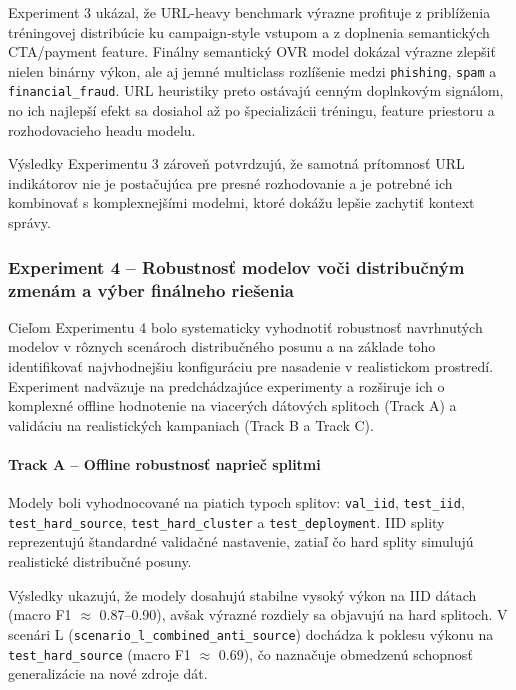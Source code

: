\documentclass[conference]{IEEEtran}
\begin{document}
Experiment 3 ukázal, že URL-heavy benchmark výrazne profituje z priblíženia tréningovej distribúcie ku campaign-style vstupom a z doplnenia semantických CTA/payment feature. Finálny semantický OVR model dokázal výrazne zlepšiť nielen binárny výkon, ale aj jemné multiclass rozlíšenie medzi \texttt{phishing}, \texttt{spam} a \texttt{financial\_fraud}. URL heuristiky preto ostávajú cenným doplnkovým signálom, no ich najlepší efekt sa dosiahol až po špecializácii tréningu, feature priestoru a rozhodovacieho headu modelu.

Výsledky Experimentu 3 zároveň potvrdzujú, že samotná prítomnosť URL indikátorov nie je postačujúca pre presné rozhodovanie a je potrebné ich kombinovať s komplexnejšími modelmi, ktoré dokážu lepšie zachytiť kontext správy.

\subsubsection{Experiment 4 – Robustnosť modelov voči distribučným zmenám a výber finálneho riešenia}\label{exp4}

Cieľom Experimentu 4 bolo systematicky vyhodnotiť robustnosť navrhnutých modelov
v rôznych scenároch distribučného posunu a na základe toho identifikovať
najvhodnejšiu konfiguráciu pre nasadenie v realistickom prostredí.
Experiment nadväzuje na predchádzajúce experimenty a rozširuje ich o
komplexné offline hodnotenie na viacerých dátových splitoch (Track A)
a validáciu na realistických kampaniach (Track B a Track C).

\paragraph{Track A – Offline robustnosť naprieč splitmi}

Modely boli vyhodnocované na piatich typoch splitov:
\texttt{val\_iid}, \texttt{test\_iid}, \texttt{test\_hard\_source},
\texttt{test\_hard\_cluster} a \texttt{test\_deployment}.
IID splity reprezentujú štandardné validačné nastavenie,
zatiaľ čo hard splity simulujú realistické distribučné posuny.

Výsledky ukazujú, že modely dosahujú stabilne vysoký výkon na IID dátach
(macro F1 $\approx$ 0.87--0.90), avšak výrazné rozdiely sa objavujú
na hard splitoch. V scenári L (\texttt{scenario\_l\_combined\_anti\_source})
dochádza k poklesu výkonu na \texttt{test\_hard\_source}
(macro F1 $\approx$ 0.69), čo naznačuje obmedzenú schopnosť
generalizácie na nové zdroje dát.
\end{document}

